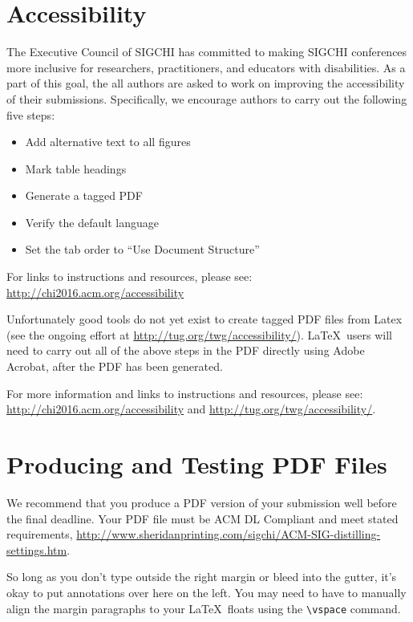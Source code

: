\documentclass[sigchi-a, authorversion]{acmart}
\begin{document}
\section{Accessibility}
The Executive Council of SIGCHI has committed to making SIGCHI
conferences more inclusive for researchers, practitioners, and
educators with disabilities. As a part of this goal, the all authors
are asked to work on improving the accessibility of their
submissions. Specifically, we encourage authors to carry out the
following five steps:
\begin{itemize}
\item Add alternative text to all figures
\item Mark table headings
\item Generate a tagged PDF
\item Verify the default language
\item Set the tab order to ``Use Document Structure''
\end{itemize}

For links to instructions and resources, please see:
\url{http://chi2016.acm.org/accessibility}

Unfortunately good tools do not yet exist to create tagged PDF files
from Latex (see the ongoing effort at
\url{http://tug.org/twg/accessibility/}). \LaTeX\ users will need to
carry out all of the above steps in the PDF directly using Adobe
Acrobat, after the PDF has been generated.

For more information and links to instructions and resources, please
see:
\url{http://chi2016.acm.org/accessibility} and
\url{http://tug.org/twg/accessibility/}.


\section{Producing and Testing PDF Files}

We recommend that you produce a PDF version of your submission well
before the final deadline. Your PDF file must be ACM DL Compliant and
meet stated requirements,
\url{http://www.sheridanprinting.com/sigchi/ACM-SIG-distilling-settings.htm}.

\begin{sidebar}
  So long as you don't type outside the right
  margin or bleed into the gutter, it's okay to put annotations over
  here on the left. You may need to have
  to manually align the margin paragraphs to your \LaTeX\ floats using
  the \texttt{{\textbackslash}vspace{}} command.
\end{sidebar}
\end{document}
